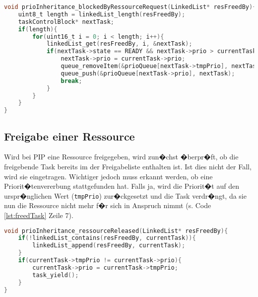 \begin{lstlisting}[language=C, label=lst:blockedTask, caption=Verwaltung einer blockierten Ressourcenanforderung]
void prioInheritance_blockedByRessourceRequest(LinkedList* resFreedBy){
	uint8_t length = linkedList_length(resFreedBy);
	taskControlBlock* nextTask;
	if(length){
		for(uint16_t i = 0; i < length; i++){
			linkedList_get(resFreedBy, i, &nextTask);
			if(nextTask->state == READY && nextTask->prio > currentTask->prio){
				nextTask->prio = currentTask->prio;
				queue_removeItem(&prioQueue[nextTask->tmpPrio], nextTask);
				queue_push(&prioQueue[nextTask->prio], nextTask);
				break;
			}
		}
	}
}
\end{lstlisting}

\subsection{Freigabe einer Ressource}
Wird bei PIP eine Ressource freigegeben, wird zun�chst �berpr�ft,
ob die freigebende Task bereits im der Freigabeliste enthalten ist.
Ist dies nicht der Fall, wird sie eingetragen. Wichtiger 
jedoch muss erkannt werden, ob eine Priorit�tenvererbung 
stattgefunden hat. Falls ja, wird die Priorit�t auf den 
urspr�nglichen Wert (\texttt{tmpPrio}) zur�ckgesetzt und die Task
verdr�ngt, da sie nun die Ressource nicht mehr f�r sich in
Anspruch nimmt (s. Code \ref{lst:freedTask} Zeile 7).

\begin{lstlisting}[language=C, label=lst:freedTask, caption=Ressource wird freigegeben]
void prioInheritance_ressourceReleased(LinkedList* resFreedBy){
	if(!linkedList_contains(resFreedBy, currentTask)){
		linkedList_append(resFreedBy, currentTask);
	}
	if(currentTask->tmpPrio != currentTask->prio){
		currentTask->prio = currentTask->tmpPrio;
		task_yield();
	}
}
\end{lstlisting}

